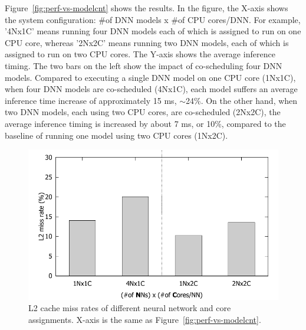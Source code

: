 Figure~\ref{fig:perf-vs-modelcnt} shows the results. In the figure, the
X-axis shows the system configuration: \#of DNN models x \#of CPU
cores/DNN. For example, '4Nx1C' means running four DNN models each of
which is assigned to run on one CPU core, whereas '2Nx2C' means running
two DNN models, each of which is assigned to run on two CPU
cores. The Y-axis shows the average inference timing.
The two bars on the left show the impact of co-scheduling four DNN
models. Compared to executing a single DNN model on one CPU core
(1Nx1C), when four DNN models are co-scheduled (4Nx1C), each model
suffers an average inference time increase of approximately 15 ms,
$\sim$24\%. On the other hand, when two DNN models, each using two CPU
cores, are co-scheduled (2Nx2C), the average inference timing is increased by
about 7 ms, or 10\%, compared to the baseline of running one model
using two CPU cores (1Nx2C). 

\begin{figure}[h]
  \centering
  \includegraphics[width=.7\textwidth]{figs/l2missrate_vs_modelcnt}
  \caption{L2 cache miss rates of different neural network and core
    assignments. X-axis is the same as Figure~\ref{fig:perf-vs-modelcnt}.} 
  \label{fig:l2missrate-vs-modelcnt}
\end{figure}

